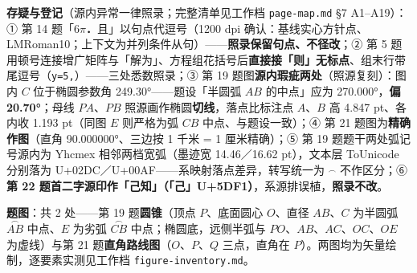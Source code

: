 \begin{gktip}
\textbf{存疑与登记}（源内异常一律照录；完整清单见工作档 \texttt{page-map.md} §7 A1–A19）：① 第 14 题「\(6\pi\)\textbf{．}且」以句点代逗号（1200 dpi 确认：基线实心方针点、LMRoman10；上下文为并列条件从句）——\textbf{照录保留句点、不径改}；② 第 5 题用顿号连接增广矩阵与「解为」、方程组花括号后\textbf{直接接「则」无标点}、组末行带尾逗号（\texttt{y=5,}）——三处悉数照录；③ 第 19 题图\textbf{源内瑕疵两处}（照源复刻）：图内 \(C\) 位于椭圆参数角 249.30°——题设「半圆弧 \(AB\) 的中点」应为 270.000°，\textbf{偏 20.70°}；母线 \(PA\)、\(PB\) 照源画作椭圆\textbf{切线}，落点比标注点 \(A\)、\(B\) 高 4.847 pt、各内收 1.193 pt（同图 \(E\) 则严格为弧 \(CB\) 中点、与题设一致）；④ 第 21 题图为\textbf{精确作图}（直角 90.000000°、三边按 1 千米 = 1 厘米精确）；⑤ 第 19 题题干两处弧记号源内为 Yhcmex 相邻两档宽弧（墨迹宽 14.46／16.62 pt），文本层 ToUnicode 分别落为 U+02DC／U+00AF——系映射落点差异，转写统一为 \(\overset{\frown}{}\) 不作区分；⑥ \textbf{第 22 题首二字源印作「己知」（「己」U+5DF1）}，系源排误植，\textbf{照录不改}。

\textbf{题图}：共 2 处——第 19 题\textbf{圆锥}（顶点 \(P\)、底面圆心 \(O\)、直径 \(AB\)、\(C\) 为半圆弧 \(\overset{\frown}{AB}\) 中点、\(E\) 为劣弧 \(\overset{\frown}{CB}\) 中点；椭圆底，远侧半弧与 \(PO\)、\(AB\)、\(AC\)、\(OC\)、\(OE\) 为虚线）与第 21 题\textbf{直角路线图}（\(O\)、\(P\)、\(Q\) 三点，直角在 \(P\)）。两图均为矢量绘制，逐要素实测见工作档 \texttt{figure-inventory.md}。
\end{gktip}



